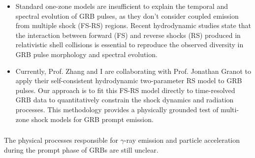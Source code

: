 \begin{itemize}
    \itemsep0em 
    \item Standard one-zone models are insufficient to explain the temporal and spectral evolution of GRB pulses, as they don’t consider coupled emission from multiple shock (FS-RS) regions. Recent hydrodynamic studies \cite{Rahaman_2023} \cite{rahaman2023internalshockshydrodynamicscollision} state that the interaction between forward (FS) and reverse shocks (RS) produced in relativistic shell collisions is essential to reproduce the observed diversity in GRB pulse morphology and spectral evolution.
    \item Currently, Prof. Zhang and I are collaborating with Prof. Jonathan Granot to apply their self-consistent hydrodynamic two-parameter RS model to GRB pulses. Our approach is to fit this FS-RS model directly to time-resolved GRB data to quantitatively constrain the shock dynamics and radiation processes. This methodology provides a physically grounded test of multi-zone shock models for GRB prompt emission.
\end{itemize}

\subsubsection*{\fontsize{11.5 pt}{10 pt}\selectfont{Particle acceleration :}}

The physical processes responsible for $\gamma$-ray emission and particle acceleration during the prompt phase of GRBs are still unclear.

